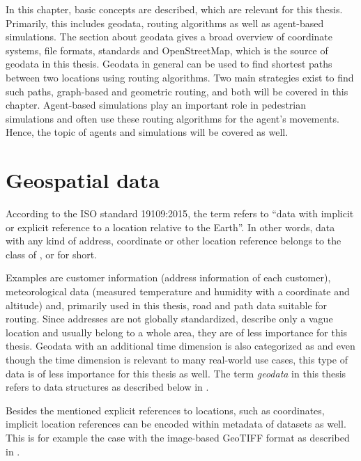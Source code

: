 
In this chapter, basic concepts are described, which are relevant for this thesis.
Primarily, this includes geodata, routing algorithms as well as agent-based simulations.
The section about geodata gives a broad overview of coordinate systems, file formats, standards and OpenStreetMap, which is the source of geodata in this thesis.
Geodata in general can be used to find shortest paths between two locations using routing algorithms.
Two main strategies exist to find such paths, graph-based and geometric routing, and both will be covered in this chapter.
Agent-based simulations play an important role in pedestrian simulations and often use these routing algorithms for the agent's movements.
Hence, the topic of agents and simulations will be covered as well.

\section{Geospatial data}

	According to the ISO standard 19109:2015\cite{iso-19109}, the term  refers to \enquote{data with implicit or explicit reference to a location relative to the Earth}.
	In other words, data with any kind of address, coordinate or other location reference belongs to the class of , or  for short.
	
	Examples are customer information (address information of each customer), meteorological data (measured temperature and humidity with a coordinate and altitude) and, primarily used in this thesis, road and path data suitable for routing.
	Since addresses are not globally standardized, describe only a vague location and usually belong to a whole area, they are of less importance for this thesis.
	Geodata with an additional time dimension is also categorized as \cite{iso-19108} and even though the time dimension is relevant to many real-world use cases, this type of data is of less importance for this thesis as well.
	The term \emph{geodata} in this thesis refers to data structures as described below in .
	
	Besides the mentioned explicit references to locations, such as coordinates, implicit location references can be encoded within metadata of datasets as well.
	This is for example the case with the image-based GeoTIFF format as described in .
		
